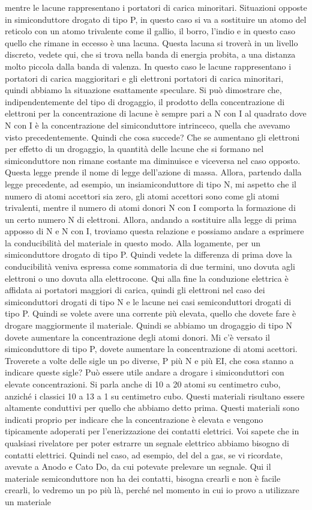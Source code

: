 mentre le lacune rappresentano i portatori di carica minoritari. Situazioni opposte in simiconduttore drogato di tipo P, in questo caso si va a sostituire un atomo del reticolo con un atomo trivalente come il gallio, il borro, l'indio e in questo caso quello che rimane in eccesso è una lacuna. Questa lacuna si troverà in un livello discreto, vedete qui, che si trova nella banda di energia probita, a una distanza molto piccola dalla banda di valenza. In questo caso le lacune rappresentano i portatori di carica maggioritari e gli elettroni portatori di carica minoritari, quindi abbiamo la situazione esattamente speculare. Si può dimostrare che, indipendentemente del tipo di drogaggio, il prodotto della concentrazione di elettroni per la concentrazione di lacune è sempre pari a N con I al quadrato dove N con I è la concentrazione del simiconduttore intrinceco, quella che avevamo visto precedentemente. Quindi che cosa succede? Che se aumentano gli elettroni per effetto di un drogaggio, la quantità delle lacune che si formano nel simiconduttore non rimane costante ma diminuisce e viceversa nel caso opposto. Questa legge prende il nome di legge dell'azione di massa. Allora, partendo dalla legge precedente, ad esempio, un insiamiconduttore di tipo N, mi aspetto che il numero di atomi accettori sia zero, gli atomi accettori sono come gli atomi trivalenti, mentre il numero di atomi donori N con I comporta la formazione di un certo numero N di elettroni. Allora, andando a sostituire alla legge di prima apposso di N e N con I, troviamo questa relazione e possiamo andare a esprimere la conducibilità del materiale in questo modo. Alla logamente, per un simiconduttore drogato di tipo P. Quindi vedete la differenza di prima dove la conducibilità veniva espressa come sommatoria di due termini, uno dovuta agli elettroni o uno dovuta alla elettrocone. Qui alla fine la conduzione elettrica è affidata ai portatori maggiori di carica, quindi gli elettroni nel caso dei simiconduttori drogati di tipo N e le lacune nei casi semiconduttori drogati di tipo P. Quindi se volete avere una corrente più elevata, quello che dovete fare è drogare maggiormente il materiale. Quindi se abbiamo un drogaggio di tipo N dovete aumentare la concentrazione degli atomi donori. Mi c'è versato il simiconduttore di tipo P, dovete aumentare la concentrazione di atomi acettori. Troverete a volte delle sigle un po diverse, P più N e più EI, che cosa stanno a indicare queste sigle? Può essere utile andare a drogare i simiconduttori con elevate concentrazioni. Si parla anche di 10 a 20 atomi su centimetro cubo, anziché i classici 10 a 13 a 1 su centimetro cubo. Questi materiali risultano essere altamente conduttivi per quello che abbiamo detto prima. Questi materiali sono indicati proprio per indicare che la concentrazione è elevata e vengono tipicamente adoperati per l'enerizzazione dei contatti elettrici. Voi sapete che in qualsiasi rivelatore per poter estrarre un segnale elettrico abbiamo bisogno di contatti elettrici. Quindi nel caso, ad esempio, del del a gas, se vi ricordate, avevate a Anodo e Cato Do, da cui potevate prelevare un segnale. Qui il materiale semiconduttore non ha dei contatti, bisogna crearli e non è facile crearli, lo vedremo un po più là, perché nel momento in cui io provo a utilizzare un materiale 